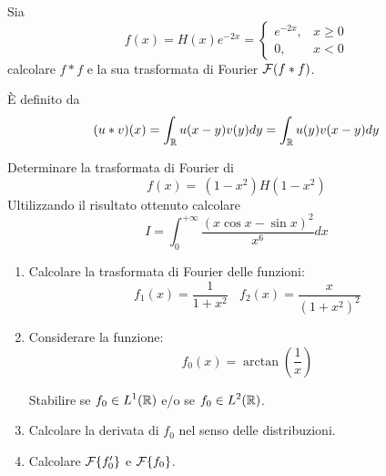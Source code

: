 \ParteEsercizi

\Esercizio{}

Sia
\begin{equation*}
f(x) = H(x) e^{- 2x} =
\begin{cases}
e^{- 2x}, & x \geq 0\\
0, & x < 0
\end{cases}
\end{equation*}
calcolare $\displaystyle f*f$ e la sua trasformata di Fourier $\displaystyle \mathcal{F} (f*f)$.
\begin{rem}
 È definito da
\begin{equation*}
(u*v)(x) = \int_{\mathbb{R}} u(x - y) v(y) dy = \int_{\mathbb{R}} u(y) v(x - y) dy
\end{equation*}
\end{rem}

\Esercizio{}

Determinare la trasformata di Fourier di
\begin{equation*}
f(x) = \ \left(1 - x^{2}\right) H\left(1 - x^{2}\right)
\end{equation*}
Ultilizzando il risultato ottenuto calcolare
\begin{equation*}
I = \int^{+ \infty}_{0}\frac{(x\cos x - \sin x)^{2}}{x^{6}} dx
\end{equation*}

\Esercizio{}

\begin{enumerate}
\item Calcolare la trasformata di Fourier delle funzioni:
\begin{equation*}
f_{1}(x) = \frac{1}{1 + x^{2}} \ \ \ \ f_{2}(x) = \frac{x}{\left(1 + x^{2}\right)^{2}}
\end{equation*}
\item Considerare la funzione:
\begin{equation*}
f_{0}(x) = \arctan\left(\frac{1}{x}\right)
\end{equation*}

Stabilire se $\displaystyle f_{0} \in L^{1}(\mathbb{R})$ e/o se $\displaystyle f_{0} \in L^{2}(\mathbb{R})$.
\item Calcolare la derivata di $\displaystyle f_{0}$ nel senso delle distribuzioni.
\item Calcolare $\mathcal{F} \{f'_{0}\}$ e $\mathcal{F} \{f_{0}\}$.
\end{enumerate}

\Esercizio{}

